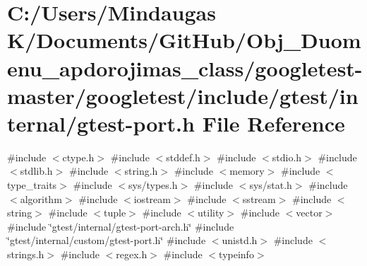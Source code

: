 \hypertarget{googletest-master_2googletest_2include_2gtest_2internal_2gtest-port_8h}{}\section{C\+:/\+Users/\+Mindaugas K/\+Documents/\+Git\+Hub/\+Obj\+\_\+\+Duomenu\+\_\+apdorojimas\+\_\+class/googletest-\/master/googletest/include/gtest/internal/gtest-\/port.h File Reference}
\label{googletest-master_2googletest_2include_2gtest_2internal_2gtest-port_8h}
{\ttfamily \#include $<$ctype.\+h$>$}\newline
{\ttfamily \#include $<$stddef.\+h$>$}\newline
{\ttfamily \#include $<$stdio.\+h$>$}\newline
{\ttfamily \#include $<$stdlib.\+h$>$}\newline
{\ttfamily \#include $<$string.\+h$>$}\newline
{\ttfamily \#include $<$memory$>$}\newline
{\ttfamily \#include $<$type\+\_\+traits$>$}\newline
{\ttfamily \#include $<$sys/types.\+h$>$}\newline
{\ttfamily \#include $<$sys/stat.\+h$>$}\newline
{\ttfamily \#include $<$algorithm$>$}\newline
{\ttfamily \#include $<$iostream$>$}\newline
{\ttfamily \#include $<$sstream$>$}\newline
{\ttfamily \#include $<$string$>$}\newline
{\ttfamily \#include $<$tuple$>$}\newline
{\ttfamily \#include $<$utility$>$}\newline
{\ttfamily \#include $<$vector$>$}\newline
{\ttfamily \#include \char`\"{}gtest/internal/gtest-\/port-\/arch.\+h\char`\"{}}\newline
{\ttfamily \#include \char`\"{}gtest/internal/custom/gtest-\/port.\+h\char`\"{}}\newline
{\ttfamily \#include $<$unistd.\+h$>$}\newline
{\ttfamily \#include $<$strings.\+h$>$}\newline
{\ttfamily \#include $<$regex.\+h$>$}\newline
{\ttfamily \#include $<$typeinfo$>$}\newline
